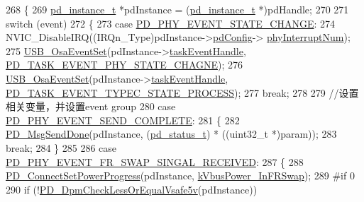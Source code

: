 \begin{DoxyCode}
268 \{
269     \hyperlink{struct__pd__instance}{pd\_instance\_t} *pdInstance = (\hyperlink{struct__pd__instance}{pd\_instance\_t} *)pdHandle;
270 
271     \textcolor{keywordflow}{switch} (event)
272     \{
273         \textcolor{keywordflow}{case} \hyperlink{group__usb__pd__phy__drv_gga9e1e6534f05a5dfae46d27dbf43e0455a1c7d2386b854afa09864304c2c407b04}{PD\_PHY\_EVENT\_STATE\_CHANGE}:
274             NVIC\_DisableIRQ((IRQn\_Type)pdInstance->\hyperlink{struct__pd__instance_a2d9a457d63da9c4cb5e3feece0cbf3ec}{pdConfig}->
      \hyperlink{struct__pd__instance__config_a131f930f58f1a9bfe1488acb62aa2725}{phyInterruptNum});
275             \hyperlink{group__usb__os__abstraction_gaa83073c31cced5742027d4046bd633db}{USB\_OsaEventSet}(pdInstance->\hyperlink{struct__pd__instance_ab04e9fcc994b2547509169e07ab21465}{taskEventHandle}, 
      \hyperlink{usb__pd__interface_8h_a08a5013301d9587b47017854a2ee5981ac05d4679325cb8c3a8491b9812e28924}{PD\_TASK\_EVENT\_PHY\_STATE\_CHAGNE});
276             \hyperlink{group__usb__os__abstraction_gaa83073c31cced5742027d4046bd633db}{USB\_OsaEventSet}(pdInstance->\hyperlink{struct__pd__instance_ab04e9fcc994b2547509169e07ab21465}{taskEventHandle}, 
      \hyperlink{usb__pd__interface_8h_a08a5013301d9587b47017854a2ee5981ae5b6c5a346b9ba137369e1193675227b}{PD\_TASK\_EVENT\_TYPEC\_STATE\_PROCESS});
277             \textcolor{keywordflow}{break};
278 
279         \textcolor{comment}{//设置相关变量，并设置event group}
280         \textcolor{keywordflow}{case} \hyperlink{group__usb__pd__phy__drv_gga9e1e6534f05a5dfae46d27dbf43e0455ad761e5459c646a3557ddd40db0860251}{PD\_PHY\_EVENT\_SEND\_COMPLETE}:
281         \{
282             \hyperlink{usb__pd__interface_8c_a6ad144a0e0d32b011f83156c3edd30a8}{PD\_MsgSendDone}(pdInstance, (\hyperlink{group__usb__pd__stack_ga04a1f331d9807a70ab9bb753f5ed1c80}{pd\_status\_t}) * ((uint32\_t *)param));
283             \textcolor{keywordflow}{break};
284         \}
285 
286         \textcolor{keywordflow}{case} \hyperlink{group__usb__pd__phy__drv_gga9e1e6534f05a5dfae46d27dbf43e0455a275e7486f8964603c2affb44cd08fc35}{PD\_PHY\_EVENT\_FR\_SWAP\_SINGAL\_RECEIVED}:
287         \{
288             \hyperlink{usb__pd__interface_8c_a83de99272e34bf7bad5146401157ccff}{PD\_ConnectSetPowerProgress}(pdInstance, 
      \hyperlink{group__usb__pd__stack_gga1af9af0106a9413093f8e0d9b796771badfb60998cac82d001b52af44674eef18}{kVbusPower\_InFRSwap});
289 \textcolor{preprocessor}{#if 0
}
290 \textcolor{preprocessor}{}            \textcolor{keywordflow}{if} (!\hyperlink{usb__pd__policy_8c_abdde9b20d8e38e68b6de66b1e9ece3eb}{PD\_DpmCheckLessOrEqualVsafe5v}(pdInstance))

\end{DoxyCode}

